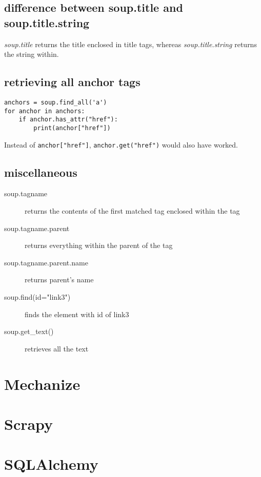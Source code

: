 \documentclass[a4paper, 12pt]{article}
\begin{document}
\subsection{difference between soup.title and soup.title.string}
\emph{soup.title} returns the title enclosed in title tags, whereas \emph{soup.title.string} returns the string within.
\subsection{retrieving all anchor tags}
\begin{verbatim}
anchors = soup.find_all('a')
for anchor in anchors:
    if anchor.has_attr("href"):
        print(anchor["href"])
\end{verbatim}
Instead of \verb|anchor["href"]|, \verb|anchor.get("href")| would also have worked.
\subsection{miscellaneous}
\begin{description}
\item[soup.tagname] returns the contents of the first matched tag enclosed within the tag
\item[soup.tagname.parent] returns everything within the parent of the tag
\item[soup.tagname.parent.name] returns parent's name
\item[soup.find(id="link3")] finds the element with id of link3
\item[soup.get\_text()] retrieves all the text
\end{description}

\section{Mechanize}

\section{Scrapy}

\section{SQLAlchemy}
\end{document}
